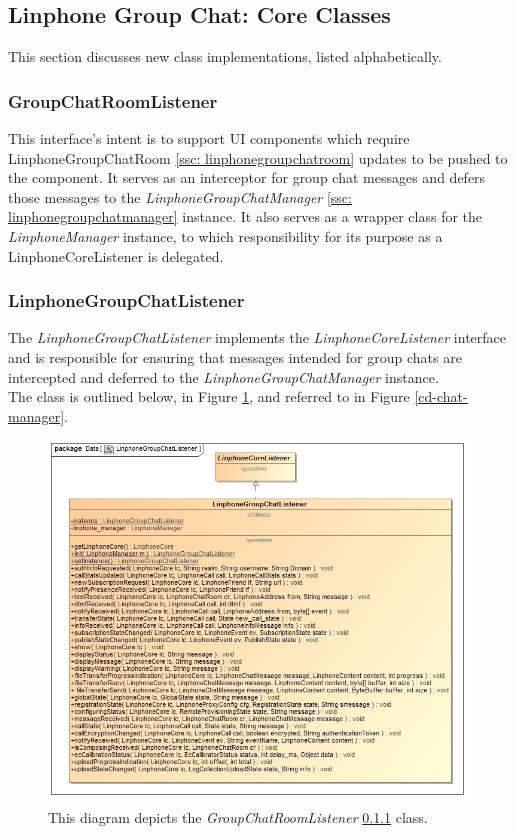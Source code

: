 \documentclass[11pt]{article}
\begin{document}
\subsection{Linphone Group Chat: Core Classes}
This section discusses new class implementations, listed alphabetically.

\subsubsection{GroupChatRoomListener}\label{ssc: groupchatroomlistener}
This interface's intent is to support UI components which require LinphoneGroupChatRoom \ref{ssc: linphonegroupchatroom} updates to be pushed to the component. It serves as an interceptor for group chat messages and defers those messages to the \textit{LinphoneGroupChatManager} \ref{ssc: linphonegroupchatmanager} instance. It also serves as a wrapper class for the \textit{LinphoneManager} instance, to which responsibility for its purpose as a {LinphoneCoreListener} is delegated.

\subsubsection{LinphoneGroupChatListener}\label{ssc: linphonegroupchatlistener}
The \textit{LinphoneGroupChatListener} implements the \textit{LinphoneCoreListener} interface and is responsible for ensuring that messages intended for group chats are intercepted and deferred to the \textit{LinphoneGroupChatManager} instance. \\
The class is outlined below, in Figure \ref{cd_linphone_group_chat_listener}, and referred to in Figure \ref{cd-chat-manager}.
\begin{figure}[H]
	\centering
	\centering
	\centerline{\includegraphics[width=6in]{./images/class_linphone_group_chat_listener.jpg}}
	\caption[LinphoneGroupChatListener Class Diagram]{This diagram depicts the \textit{GroupChatRoomListener} \ref{ssc: groupchatroomlistener} class.}
	\label{cd_linphone_group_chat_listener}
\end{figure}
\end{document}
